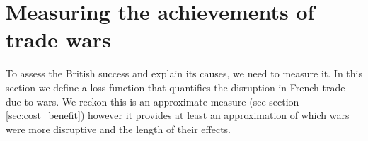 \documentclass[12pt,a4paper,notitlepage,english]{article}
\begin{document}

\section{Measuring the achievements of trade wars}


To assess the British success and explain its causes, we need to measure it.
In this section we define a loss function that quantifies the disruption in French trade due to wars.
We reckon this is an approximate measure (see section \ref{sec:cost_benefit}) however it provides at least an approximation of which wars were more disruptive and the length of their effects. 
\end{document}
